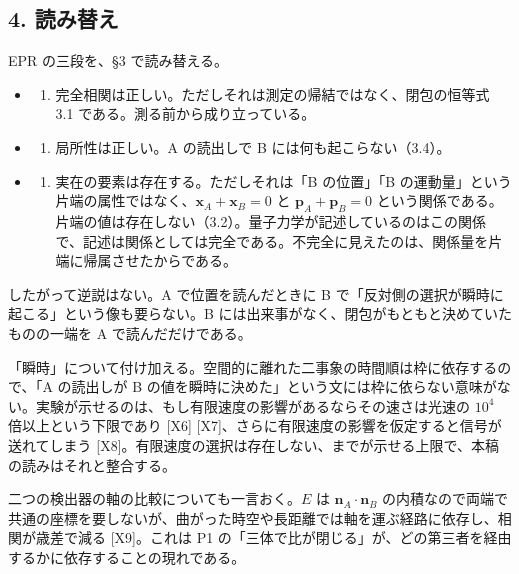 \documentclass[
  a4paper,
]{ltjsarticle}
\providecommand{\tightlist}{%
  \setlength{\itemsep}{0pt}\setlength{\parskip}{0pt}}
\begin{document}
\subsection{4. 読み替え}\label{ux8aadux307fux66ffux3048}

EPR の三段を、§3 で読み替える。

\begin{itemize}
\tightlist
\item
  \begin{enumerate}
  \def\labelenumi{(\roman{enumi})}
  \tightlist
  \item
    完全相関は正しい。ただしそれは測定の帰結ではなく、閉包の恒等式 3.1
    である。測る前から成り立っている。
  \end{enumerate}
\item
  \begin{enumerate}
  \def\labelenumi{(\roman{enumi})}
  \setcounter{enumi}{1}
  \tightlist
  \item
    局所性は正しい。A の読出しで B には何も起こらない（3.4）。
  \end{enumerate}
\item
  \begin{enumerate}
  \def\labelenumi{(\roman{enumi})}
  \setcounter{enumi}{2}
  \tightlist
  \item
    実在の要素は存在する。ただしそれは「B の位置」「B
    の運動量」という片端の属性ではなく、\(\boldsymbol{x}_A+\boldsymbol{x}_B=0\)
    と \(\boldsymbol{p}_A+\boldsymbol{p}_B=0\)
    という関係である。片端の値は存在しない（3.2）。量子力学が記述しているのはこの関係で、記述は関係としては完全である。不完全に見えたのは、関係量を片端に帰属させたからである。
  \end{enumerate}
\end{itemize}

したがって逆説はない。A で位置を読んだときに B
で「反対側の選択が瞬時に起こる」という像も要らない。B
には出来事がなく、閉包がもともと決めていたものの一端を A
で読んだだけである。

「瞬時」について付け加える。空間的に離れた二事象の時間順は枠に依存するので、「A
の読出しが B
の値を瞬時に決めた」という文には枠に依らない意味がない。実験が示せるのは、もし有限速度の影響があるならその速さは光速の
\(10^4\) 倍以上という下限であり {[}X6{]}
{[}X7{]}、さらに有限速度の影響を仮定すると信号が送れてしまう
{[}X8{]}。有限速度の選択は存在しない、までが示せる上限で、本稿の読みはそれと整合する。

二つの検出器の軸の比較についても一言おく。\(E\) は
\(\boldsymbol{n}_A\cdot\boldsymbol{n}_B\)
の内積なので両端で共通の座標を要しないが、曲がった時空や長距離では軸を運ぶ経路に依存し、相関が歳差で減る
{[}X9{]}。これは P1
の「三体で比が閉じる」が、どの第三者を経由するかに依存することの現れである。
\end{document}
